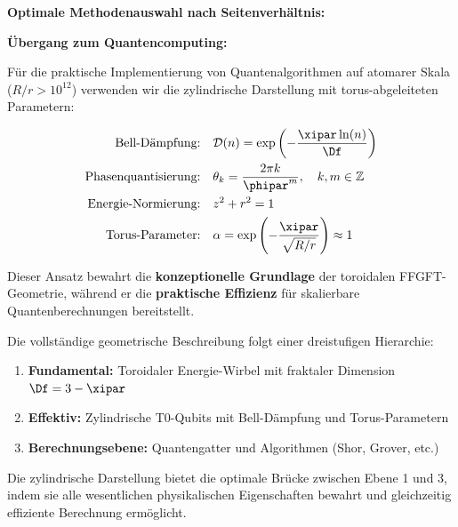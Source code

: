 \textbf{Optimale Methodenauswahl nach Seitenverhältnis:}

\begin{table}[h]
	\centering
	\caption{Empfohlener Ansatz nach Systemskala}
	\label{tab:method_by_scale}
\end{table}

\textbf{Übergang zum Quantencomputing:}

Für die praktische Implementierung von Quantenalgorithmen auf atomarer Skala 
($R/r > 10^{12}$) verwenden wir die zylindrische Darstellung mit 
torus-abgeleiteten Parametern:

\begin{align}
	\text{Bell-Dämpfung:} \quad & \mathcal{D}(n) = \exp\left(-\frac{\xipar\ln(n)}{\Df}\right) \\
	\text{Phasenquantisierung:} \quad & \theta_k = \frac{2\pi k}{\phipar^m}, \quad k,m \in \mathbb{Z} \\
	\text{Energie-Normierung:} \quad & z^2 + r^2 = 1 \\
	\text{Torus-Parameter:} \quad & \alpha = \exp\left(-\frac{\xipar}{\sqrt{R/r}}\right) \approx 1
\end{align}

Dieser Ansatz bewahrt die \textbf{konzeptionelle Grundlage} der toroidalen 
FFGFT-Geometrie, während er die \textbf{praktische Effizienz} für skalierbare 
Quantenberechnungen bereitstellt.

\begin{remark}
	Die vollständige geometrische Beschreibung folgt einer dreistufigen Hierarchie:
	\begin{enumerate}
		\item \textbf{Fundamental:} Toroidaler Energie-Wirbel mit fraktaler Dimension $\Df=3-\xipar$
		\item \textbf{Effektiv:} Zylindrische T0-Qubits mit Bell-Dämpfung und Torus-Parametern
		\item \textbf{Berechnungsebene:} Quantengatter und Algorithmen (Shor, Grover, etc.)
	\end{enumerate}
	Die zylindrische Darstellung bietet die optimale Brücke zwischen Ebene 1 und 3, 
	indem sie alle wesentlichen physikalischen Eigenschaften bewahrt und gleichzeitig 
	effiziente Berechnung ermöglicht.
\end{remark}

